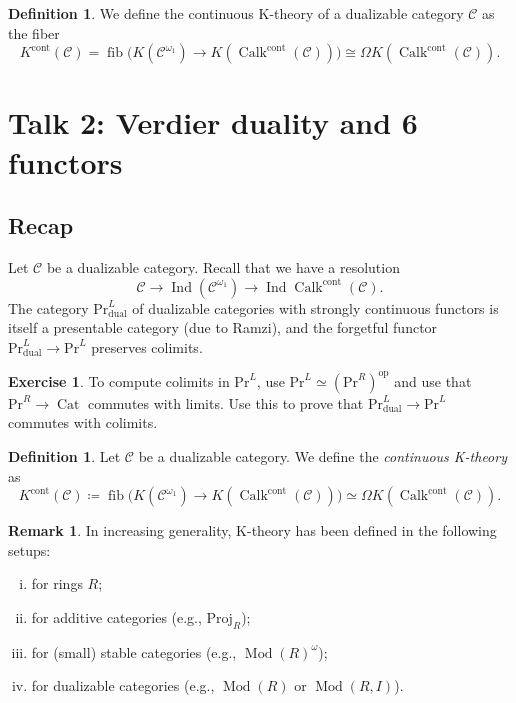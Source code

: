 \documentclass[draft]{amsart}
\newcommand{\cat}[1]{\mathcal{#1}}
\newcommand{\op}{\mathrm{op}}
\renewcommand{\Pr}{\mathrm{Pr}}
\DeclareMathOperator{\fib}{fib}
\DeclareMathOperator{\Ind}{Ind}
\DeclareMathOperator{\Cat}{Cat}
\DeclareMathOperator{\Mod}{Mod}
\DeclareMathOperator{\Calk}{Calk}
\theoremstyle{definition}
\newtheorem{defn}[thm]{Definition}
\newtheorem{rem}[thm]{Remark}
\newtheorem{exercise}[thm]{Exercise}
\begin{document}
\begin{defn}
We define the continuous K-theory of a dualizable category $\cat C$ as the fiber
\[
K^{\mathrm{cont}}(\cat C) = \fib\bigl(K(\cat C^{\omega_1}) \to K(\Calk^{\mathrm{cont}}(\cat C))\bigr) \cong \Omega K(\Calk^{\mathrm{cont}}(\cat C)).
\]
\end{defn}


\section{Talk 2: Verdier duality and 6 functors}
\subsection{Recap}
Let $\cat C$ be a dualizable category. Recall that we have a resolution
\[
\cat C \to \Ind(\cat C^{\omega_1}) \to \Ind\Calk^{\mathrm{cont}}(\cat C).
\]
The category $\Pr^L_{\mathrm{dual}}$ of dualizable categories with strongly continuous functors is itself a presentable category (due to Ramzi), and the forgetful functor $\Pr^L_{\mathrm{dual}} \to \Pr^L$ preserves colimits. 

\begin{exercise}
To compute colimits in $\Pr^L$, use $\Pr^L \simeq (\Pr^R)^{\op}$ and use that $\Pr^R \to \Cat$ commutes with limits. Use this to prove that $\Pr^L_{\mathrm{dual}} \to \Pr^L$ commutes with colimits.
\end{exercise}

\begin{defn}
Let $\cat C$ be a dualizable category. We define the \emph{continuous K-theory} as
\[
K^{\mathrm{cont}}(\cat C)\coloneqq \fib\bigl(K(\cat C^{\omega_1}) \to K(\Calk^{\mathrm{cont}}(\cat C))\bigr) \simeq \Omega K(\Calk^{\mathrm{cont}}(\cat C)).
\]
\end{defn}

\begin{rem}
In increasing generality, K-theory has been defined in the following setups:
\begin{enumerate}[(i)]
\item for rings $R$;
\item for additive categories (e.g., $\mathrm{Proj}_R$);
\item for (small) stable categories (e.g., $\Mod(R)^{\omega}$);
\item for dualizable categories (e.g., $\Mod(R)$ or $\Mod(R,I)$).
\end{enumerate}
\end{rem}
\end{document}
